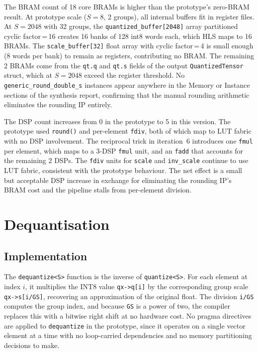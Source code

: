 The BRAM count of 18 core BRAMs is higher than the prototype's
zero-BRAM result. At prototype scale ($S = 8$, 2 groups), all internal
buffers fit in register files. At $S = 2048$ with 32 groups, the
\texttt{quantized\_buffer[2048]} array partitioned cyclic factor\,=\,16
creates 16 banks of 128 int8 words each, which HLS maps to 16 BRAMs.
The \texttt{scale\_buffer[32]} float array with cyclic factor\,=\,4
is small enough (8 words per bank) to remain as registers, contributing
no BRAM. The remaining 2 BRAMs come from the \texttt{qt.q} and
\texttt{qt.s} fields of the output \texttt{QuantizedTensor} struct, which
at $S = 2048$ exceed the register threshold. No
\texttt{generic\_round\_double\_s} instances appear anywhere in the Memory
or Instance sections of the synthesis report, confirming that the manual
rounding arithmetic eliminates the rounding IP entirely.

The DSP count increases from 0 in the prototype to 5 in this version.
The prototype used \texttt{round()} and per-element \texttt{fdiv}, both
of which map to LUT fabric with no DSP involvement. The reciprocal trick
in iteration~6 introduces one \texttt{fmul} per element, which maps to
a 3-DSP \texttt{fmul} unit, and an \texttt{fadd} that accounts for the
remaining 2 DSPs. The \texttt{fdiv} units for \texttt{scale} and
\texttt{inv\_scale} continue to use LUT fabric, consistent with the
prototype behaviour. The net effect is a small but acceptable DSP increase
in exchange for eliminating the rounding IP's BRAM cost and the
pipeline stalls from per-element division.



\section{Dequantisation}
\label{sec:dequantize_impl}

\subsection{Implementation}
\label{subsec:dequantize_impl}

The \texttt{dequantize<S>} function is the inverse of
\texttt{quantize<S>}. For each element at index $i$, it multiplies the
INT8 value \texttt{qx->q[i]} by the corresponding group scale
\texttt{qx->s[i/GS]}, recovering an approximation of the original float.
The division \texttt{i/GS} computes the group index, and because
\texttt{GS} is a power of two, the compiler replaces this with a
bitwise right shift at no hardware cost. No pragma directives are
applied to \texttt{dequantize} in the prototype, since it operates on
a single vector element at a time with no loop-carried dependencies and
no memory partitioning decisions to make.

